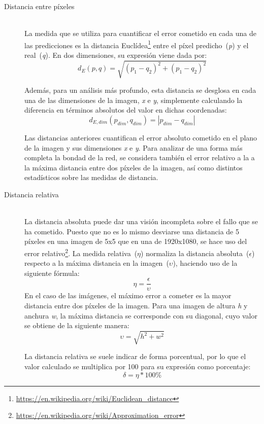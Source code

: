 \begin{description}
\item[Distancia entre píxeles] \hfill 
\vspace{10pt}
\\
La medida que se utiliza para cuantificar el error cometido en cada una de las predicciones es la distancia Euclídea\footnote{\url{https://en.wikipedia.org/wiki/Euclidean_distance}}  entre el píxel predicho~(\textit{p}) y el real~(\textit{q}). En dos dimensiones, su expresión viene dada por:  
$$d_E(p,q) = \sqrt{(p_1 - q_2)^2 + (p_1 - q_2)^2}$$

Además, para un  análisis más profundo, esta distancia se desglosa en cada una de las dimensiones de la imagen, \textit{x} e \textit{y}, simplemente calculando la diferencia en términos absolutos del valor en dichas coordenadas:
$$d_{E,dim}(p_{dim}, q_{dim}) = |p_{dim} - q_{dim}|$$

Las distancias anteriores cuantifican el error absoluto cometido en el plano de la imagen  y sus dimensiones \textit{x} e \textit{y}. Para analizar de una forma más completa la bondad de la red, se considera también el error relativo a la a la máxima distancia entre dos píxeles de la imagen, así como distintos estadísticos sobre las medidas de distancia.

\vspace{10pt}

\item[Distancia relativa] \hfill 
\vspace{10pt}
\\
La distancia absoluta puede dar una visión incompleta sobre el fallo que se ha cometido. Puesto que no es lo mismo desviarse una distancia de 5 píxeles en una imagen de 5x5 que en una de 1920x1080, se hace uso del error relativo\footnote{\url{https://en.wikipedia.org/wiki/Approximation_error}}. La medida relativa~($\eta$) normaliza la distancia absoluta~($\epsilon$) respecto a la máxima distancia en la imagen~($\upsilon$), haciendo uso de la siguiente fórmula:
$$\eta = \frac{\epsilon}{\upsilon}$$
En el caso de las imágenes, el máximo error a cometer es la mayor distancia entre dos píxeles de la imagen. Para una imagen de altura \textit{h} y anchura \textit{w}, la máxima distancia se corresponde con su diagonal, cuyo valor se obtiene de la siguiente manera:
$$\upsilon = \sqrt{h^2 + w^2}$$

La distancia relativa se suele indicar de forma porcentual, por lo que el valor calculado se multiplica por 100 para su expresión como porcentaje:
$$\delta = \eta * 100\%$$


\end{description}
